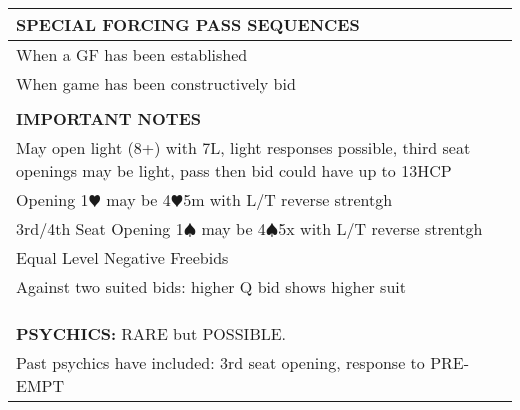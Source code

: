 \documentclass{article}
\renewcommand\H{\color{red}\ensuremath{\varheartsuit}}
\renewcommand\S{\ensuremath{\spadesuit}}
\begin{document}
\begin{minipage}{90mm}
\begin{tabular}{| p{88mm} |}
		\cellcolor{orange!25}\textbf{SPECIAL FORCING PASS SEQUENCES} \\ \hline
		When a GF has been established\\ \hline
		When game has been constructively bid\\ \hline
		\\ \hline
		\cellcolor{orange!25}\textbf{IMPORTANT NOTES} \\ \hline
		May open light (8+) with 7L, light responses possible, 
		third seat openings may be light,		
		pass then bid could have up to 13HCP\\ \hline
		Opening 1{\H} may be 4{\H}5m with L/T reverse strentgh\\ \hline
		3rd/4th Seat Opening 1{\S} may be 4{\S}5x with L/T reverse strentgh\\ \hline
		Equal Level Negative Freebids\\ \hline
		Against two suited bids: higher Q bid shows higher suit \\ \hline
		\\ \hline		
		\\ \hline
		\\ \hline

		\cellcolor{orange!25}\textbf{PSYCHICS:} RARE but POSSIBLE.  \\ \hline
		Past psychics have included: 3rd seat opening, response to PRE-EMPT \\ \hline
	\end{tabular}
\end{minipage}
\end{document}
